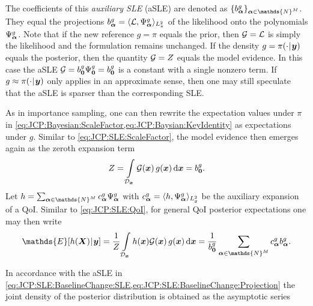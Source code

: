 The coefficients of this \emph{auxiliary SLE} (aSLE) are denoted as \(\{\coeffBaseL_{\bm{\alpha}}\}_{\bm{\alpha} \in \mathds{N}^\dimParam}\).
They equal the projections \(b^{g}_{\bm{\alpha}} = \langle \mathcal{L}, \Psi^{g}_{\bm{\alpha}} \rangle_{L_{\pi}^2}\) of the likelihood onto the polynomials \(\Psi^{g}_{\bm{\alpha}}\).
Note that if the new reference \(g = \pi\) equals the prior, then \(\mathcal{G} = \mathcal{L}\) is simply the likelihood and the formulation remains unchanged.
If the density \(g = \pi(\cdot {\:\!}|{\:\!} \bm{y})\) equals the posterior, then the quantity \(\mathcal{G} = Z\) equals the model evidence.
In this case the aSLE \(\mathcal{G} = b^{g}_{\bm{0}} \Psi^{g}_{\bm{0}} = b^{g}_{\bm{0}}\) is a constant with a single nonzero term.
If \(g \approx \pi(\cdot {\:\!}|{\:\!} \bm{y})\) only applies in an approximate sense, then one may still speculate that the aSLE is sparser than the corresponding SLE.
\par %
As in importance sampling, one can then rewrite the expectation values under \(\pi\) in \cref{eq:JCP:Bayesian:ScaleFactor,eq:JCP:Baysian:KeyIdentity} as expectations under \(g\).
Similar to \cref{eq:JCP:SLE:ScaleFactor}, the model evidence then emerges again as the zeroth expansion term
\begin{equation} \label{eq:JCP:SLE:BaselineChange:ScaleFactor}
  Z
  = \int\limits_{\mathcal{D}_{\bm{x}}} \mathcal{G}(\bm{x}) \, g(\bm{x}) \, \mathrm{d} \bm{x}
  = b^{g}_{\bm{0}}.
\end{equation}
Let \(h = \sum_{\bm{\alpha} \in \mathds{N}^\dimParam} \coeffBaseH_{\bm{\alpha}} \basisBase_{\bm{\alpha}}\)
with \(c^{g}_{\bm{\alpha}} = \langle h, \Psi^{g}_{\bm{\alpha}} \rangle_{L_{g}^2}\) be the auxiliary expansion of a QoI.
Similar to \cref{eq:JCP:SLE:QoI}, for general QoI posterior expectations one may then write
\begin{equation} \label{eq:JCP:SLE:BaselineChange:KeyIdentity}
  \mathds{E}[h(\bm{X}) \cond \bm{y}]
  = \frac{1}{\scale} \int\limits_{\mathcal{D}_{\bm{x}}} h(\bm{x}) \auxQuantity(\bm{x}) \, \newBase(\bm{x}) \, \mathrm{d} \bm{x}
  = \frac{1}{\coeffBaseL_{\bm{0}}} \sum\limits_{\bm{\alpha} \in \mathds{N}^\dimParam} \coeffBaseH_{\bm{\alpha}} \coeffBaseL_{\bm{\alpha}}.
\end{equation}
\par %
In accordance with the aSLE in \cref{eq:JCP:SLE:BaselineChange:SLE,eq:JCP:SLE:BaselineChange:Projection} the joint density of the posterior distribution is obtained as the asymptotic series
